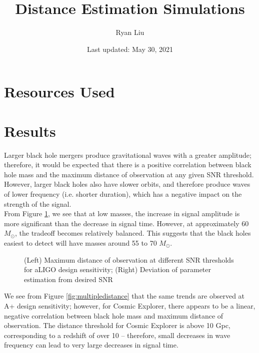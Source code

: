 \documentclass{article}
\title{Distance Estimation Simulations}
\author{Ryan Liu}
\date{Last updated: May 30, 2021}
\begin{document}
\maketitle

\section{Resources Used}

\section{Results}

Larger black hole mergers produce gravitational waves with a greater amplitude; therefore, it would be expected that there is a positive correlation between black hole mass and the maximum distance of observation at any given SNR threshold. However, larger black holes also have slower orbits, and therefore produce waves of lower frequency (i.e. shorter duration), which has a negative impact on the strength of the signal. \\

From Figure \ref{fig:mass}, we see that at low masses, the increase in signal amplitude is more significant than the decrease in signal time. However, at approximately 60 $M_\odot$, the tradeoff becomes relatively balanced. This suggests that the black holes easiest to detect will have masses around 55 to 70 $M_\odot$. 

\begin{figure}[!htb]
    \caption{\label{fig:mass} (Left) Maximum distance of observation at different SNR thresholds for aLIGO design sensitivity; (Right) Deviation of parameter estimation from desired SNR}
\end{figure}

We see from Figure \ref{fig:multipledistance} that the same trends are observed at A+ design sensitivity; however, for Cosmic Explorer, there appears to be a linear, negative correlation between black hole mass and maximum distance of observation. The distance threshold for Cosmic Explorer is above 10 Gpc, corresponding to a redshift of over 10 -- therefore, small decreases in wave frequency can lead to very large decreases in signal time. \\
\end{document}
